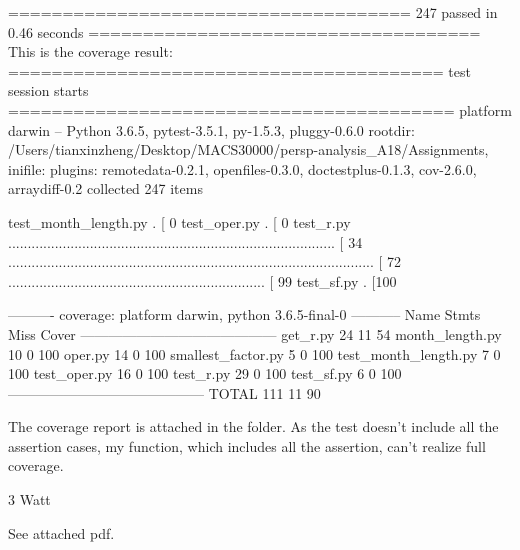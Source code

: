 \documentclass[11pt]{article}
\begin{document}
===================================== 247 passed in 0.46 seconds ====================================
    This is the coverage result:
======================================== test session starts =========================================
platform darwin -- Python 3.6.5, pytest-3.5.1, py-1.5.3, pluggy-0.6.0
rootdir: /Users/tianxinzheng/Desktop/MACS30000/persp-analysis_A18/Assignments, inifile:
plugins: remotedata-0.2.1, openfiles-0.3.0, doctestplus-0.1.3, cov-2.6.0, arraydiff-0.2
collected 247 items                                                                                  

test_month_length.py .                                                                         [  0%
test_oper.py .                                                                                 [  0%
test_r.py .................................................................................... [ 34%
.............................................................................................. [ 72%
..................................................................                             [ 99%
test_sf.py .                                                                                   [100%

---------- coverage: platform darwin, python 3.6.5-final-0 -----------
Name                   Stmts   Miss  Cover
------------------------------------------
get_r.py                  24     11    54%
month_length.py           10      0   100%
oper.py                   14      0   100%
smallest_factor.py         5      0   100%
test_month_length.py       7      0   100%
test_oper.py              16      0   100%
test_r.py                 29      0   100%
test_sf.py                 6      0   100%
------------------------------------------
TOTAL                    111     11    90%


    The coverage report is attached in the folder. As the test doesn't
include all the assertion cases, my function, which includes all the
assertion, can't realize full coverage.

    3 Watt

    See attached pdf.


    
    
    
    
\end{document}
